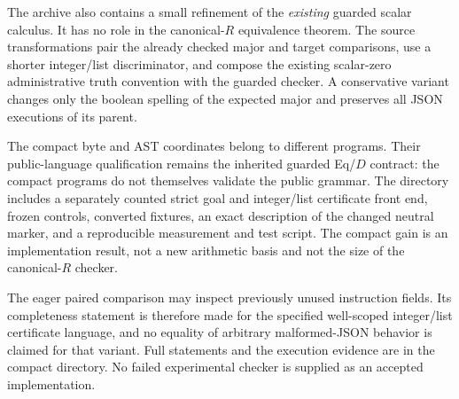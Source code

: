 The archive also contains a small refinement of the \emph{existing} guarded
scalar calculus. It has no role in the canonical-$R$ equivalence theorem.
The source transformations pair the already checked major and target
comparisons, use a shorter integer/list discriminator, and compose the
existing scalar-zero administrative truth convention with the guarded
checker. A conservative variant changes only the boolean spelling of the
expected major and preserves all JSON executions of its parent.



The compact byte and AST coordinates belong to different programs. Their
public-language qualification remains the inherited guarded Eq/$D$ contract:
the compact programs do not themselves validate the public grammar. The
directory includes a separately counted strict goal and integer/list
certificate front end, frozen controls, converted fixtures, an exact
description of the changed neutral marker, and a reproducible measurement
and test script. The compact gain is an implementation result, not a new
arithmetic basis and not the size of the canonical-$R$ checker.

The eager paired comparison may inspect previously unused instruction
fields. Its completeness statement is therefore made for the specified
well-scoped integer/list certificate language, and no equality of arbitrary
malformed-JSON behavior is claimed for that variant. Full statements and
the execution evidence are in the compact directory. No failed experimental
checker is supplied as an accepted implementation.

